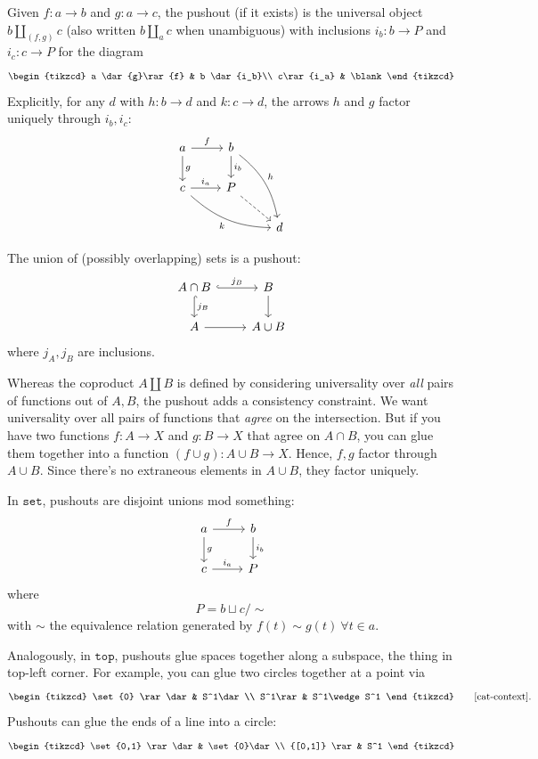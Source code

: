 \documentclass[a5paper]{scrartcl}
\def\topcat{\texttt{top}}
\def\setcat{\texttt{set}}
\begin{document}
\begin{defn}[Pushout]
  Given \(f: a \to b\) and \(g: a \to c\), the pushout (if it exists) is the universal object \(b\amalg_{(f,g)} c\) (also written \(b\amalg_a c\) when unambiguous) with inclusions \(i_b: b \to P\) and \(i_c: c\to P\) for the diagram
  \[
    \begin{tikzcd}
      a \dar{g}\rar{f} & b \dar{i_b}\\
      c\rar{i_a} & \blank
    \end{tikzcd}
  \]
  Explicitly, for any \(d\) with \(h: b\to d\)  and \(k: c\to d\), the arrows \(h\) and \(g\) factor uniquely through \(i_b,i_c\):
  \[
    \begin{tikzcd}
      a \dar{g}\rar{f} & b \dar{i_b} \ar[bend left=2em,"h"]{ddr}\\
      c\rar{i_a}\ar[bend right= 2em,swap,"k"]{drr} & P\ar[dashed]{rd} \\
      & & d
    \end{tikzcd}
  \]
\end{defn}
The union of (possibly overlapping) sets is a pushout:
\[
  \begin{tikzcd}
    A \cap B \rar[hook]{j_B} \dar[hook]{j_B}& B\dar \\
    A\rar & A \cup B
  \end{tikzcd}
\]
where \(j_A,j_B\) are inclusions.

Whereas the coproduct \(A\amalg B\) is defined by considering universality over \emph{all} pairs of functions out of \(A,B\), the pushout adds a consistency constraint. We want universality over all pairs of functions that \emph{agree} on the intersection. But if you have two functions \(f:A \to X\) and \(g: B\to X\) that agree on \(A\cap B\), you can glue them together into a function \((f\cup g): A\cup B \to X\). Hence, \(f,g\) factor through \(A\cup B\). Since there's no extraneous elements in \(A\cup B\), they factor uniquely.

In \(\setcat\), pushouts are disjoint unions mod something:
\[
    \begin{tikzcd}
      a \dar{g}\rar{f} & b \dar{i_b}\\
      c\rar{i_a} & P
    \end{tikzcd}
\]
where
\[
  P = b \sqcup c / {\sim}
\]
with \(\sim\) the equivalence relation generated by \(f(t)\sim g(t)\ \forall t \in a\).

Analogously, in \(\topcat\), pushouts glue spaces together along a subspace, the thing in top-left corner. For example, you can glue two circles together at a point via
\[
  \begin{tikzcd}
    \set{0} \rar\dar & S^1\dar \\
    S^1\rar & S^1\wedge S^1
  \end{tikzcd}
\hbox to 0pt{\qquad \text{\cite[81]{cat-context}.}}
\]
Pushouts can glue the ends of a line into a circle:
\[
  \begin{tikzcd}
    \set{0,1} \rar\dar& \set{0}\dar \\
    {[0,1]} \rar & S^1
  \end{tikzcd}
\]
\end{document}
